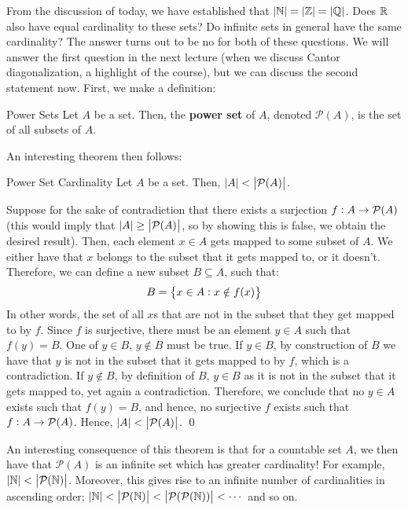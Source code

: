 From the discussion of today, we have established that $\abs{\mathbb{N}} = \abs{\mathbb{Z}} = \abs{\mathbb{Q}}$. Does $\mathbb{R}$ also have equal cardinality to these sets? Do infinite sets in general have the same cardinality? The answer turns out to be no for both of these questions. We will answer the first question in the next lecture (when we discuss Cantor diagonalization, a highlight of the course), but we can discuss the second statement now. First, we make a definition:
\begin{ndef}{Power Sets}
    Let $A$ be a set. Then, the \textbf{power set} of $A$, denoted $\mathcal{P}(A)$, is the set of all subsets of $A$. 
\end{ndef}
\noindent An interesting theorem then follows:
\begin{ntheorem}{Power Set Cardinality}
    Let $A$ be a set. Then, $\abs{A} < \abs{\mathcal{P}(A)}$.
\end{ntheorem}
\begin{nproof}
    Suppose for the sake of contradiction that there exists a surjection $f: A\rightarrow \mathcal{P}({A})$ (this would imply that $\abs{A} \geq \abs{\mathcal{P}({A})}$, so by showing this is false, we obtain the desired result). Then, each element $x \in A$ gets mapped to some subset of $A$. We either have that $x$ belongs to the subset that it gets mapped to, or it doesn't. Therefore, we can define a new subset $B \subseteq A$, such that:
    \[B = \set{x\in A: x \notin f(x)}\]
    In other words, the set of all $x$s that are not in the subset that they get mapped to by $f$. Since $f$ is surjective, there must be an element $y \in A$ such that $f(y) = B$. One of $y \in B$, $y \notin B$ must be true. If $y \in B$, by construction of $B$ we have that $y$ is not in the subset that it gets mapped to by $f$, which is a contradiction. If $y \notin B$, by definition of $B$, $y \in B$ as it is not in the subset that it gets mapped to, yet again a contradiction. Therefore, we conclude that no $y \in A$ exists such that $f(y) = B$, and hence, no surjective $f$ exists such that $f: A \rightarrow \mathcal{P}({A})$. Hence, $\abs{A} < \abs{\mathcal{P}({A})}$. \qed
\end{nproof}
\noindent An interesting consequence of this theorem is that for a countable set $A$, we then have that $\mathcal{P}(A)$ is an infinite set which has greater cardinality! For example, $\abs{\mathbb{N}} < \abs{\mathcal{P}(\mathbb{N})}$. Moreover, this gives rise to an infinite number of cardinalities in ascending order; $\abs{\mathbb{N}} < \abs{\mathcal{P}({\mathbb{N}})} < \abs{\mathcal{P}({\mathcal{P}({\mathbb{N}})})} < \cdots$ and so on.

